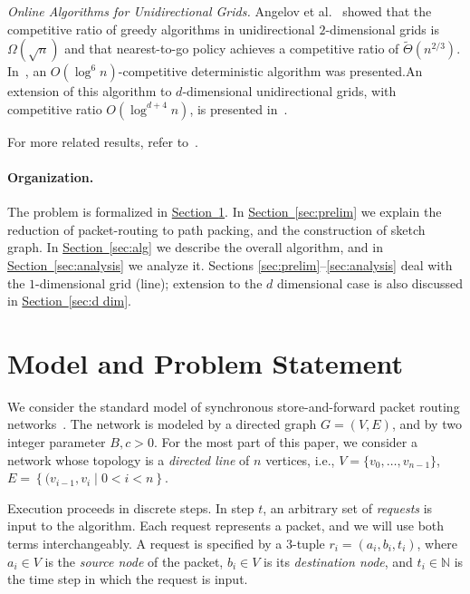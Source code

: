 \documentclass[11pt]{article}
\newcommand{\namedref}[2]{\hyperref[#2]{#1~\ref*{#2}}}
\newcommand{\sectionref}[1]{\namedref{Section}{#1}}
\newenvironment{proof sketch}[1]{\noindent {\emph{Proof sketch of #1:}}}{\hfill \qed}
\newcommand{\Set}[1]{\left\{#1\right\}}
\begin{document}
\sloppy
\emph{Online Algorithms for Unidirectional Grids.} Angelov et al.~\cite{AKK} showed that the
competitive ratio of greedy algorithms in unidirectional
$2$-dimensional grids is $\Omega(\sqrt{n})$ and that
nearest-to-go policy achieves a competitive ratio of
$\tilde{\Theta}(n^{2/3})$.
In~\cite{DBLP:conf/spaa/EvenM11}, an $O(\log^6
n)$-competitive deterministic algorithm was
presented.An extension of
this algorithm to $d$-dimensional unidirectional grids, with competitive
ratio $O(\log^{d+4} n)$,  is
presented in~\cite{DBLP:conf/spaa/EvenM11}.

For more related results, refer to~\cite{EM14}.


\paragraph{Organization\ifnum{}.\fi}
The problem is formalized in \sectionref{sec:problem}.
In \sectionref{sec:prelim} we explain the reduction of
packet-routing to path packing, and the construction of sketch graph.
In \sectionref{sec:alg} we describe the overall algorithm,
and in \sectionref{sec:analysis} we analyze it. Sections
\ref{sec:prelim}--\ref{sec:analysis} deal with the
$1$-dimensional grid (line); extension to the $d$
dimensional case is also discussed in
\sectionref{sec:d dim}.






\section{Model and Problem Statement}
\label{sec:problem}
\label{sect:problem}

We consider the standard model of synchronous store-and-forward packet
routing networks~\cite{AKOR,AKK,AZ}. The network is modeled by a
directed graph $G=(V,E)$, and by two integer parameter $B,c>0$.
For the most part of this paper, we consider a network whose topology
is  a \emph{directed line} of $n$
vertices, i.e.,
$V=\{v_0,\ldots,v_{n-1}\}$, $E=\Set{(v_{i-1},v_i\mid 0<i<n}$.


Execution proceeds in discrete steps. In step $t$, an arbitrary set of
\emph{requests} is input to the algorithm. Each request represents a
packet, and we will use both terms interchangeably. A request is
specified by a $3$-tuple
$r_i=(a_i,b_i,t_i)$, where $a_i\in V$ is the \emph{source node} of the
packet, $b_i\in V$ is its \emph{destination node}, and $t_i\in \mathbb{N}$ is
the time step in which the request is input.
\end{document}
